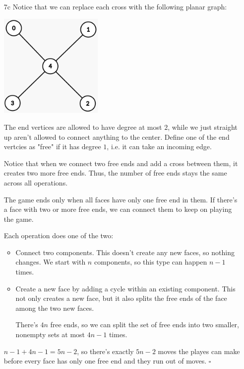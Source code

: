 \documentclass[12pt]{article}
\begin{document}
\begin{enumerate}
    \item[7c] Notice that we can replace each cross with the following planar graph:
        \begin{center}
            \includegraphics[width=5cm]{img/hw4/new_cross}
        \end{center}
        The end vertices are allowed to have degree at most $2$,
        while we just straight up aren't allowed to connect anything to the center.
        Define one of the end vertcies as "free" if it has degree $1$,
        i.e. it can take an incoming edge.

        Notice that when we connect two free ends and add
        a cross between them, it creates two more free ends.
        Thus, the number of free ends stays the same across all operations.

        The game ends only when all faces have only one free end in them.
        If there's a face with two or more free ends,
        we can connect them to keep on playing the game.

        Each operation does one of the two:
        \begin{itemize}
            \item Connect two components.
                  This doesn't create any new faces, so nothing changes.
                  We start with $n$ components, so this type can happen $n-1$ times.

            \item Create a new face by adding a cycle within an existing component.
                  This not only creates a new face, but it also splits the free
                  ends of the face among the two new faces.

                  There's $4n$ free ends, so we can split the set of free ends
                  into two smaller, nonempty sets at most $4n-1$ times.
        \end{itemize}
        $n-1+4n-1=\boxed{5n-2}$, so there's exactly $5n-2$ moves
        the playes can make before every face has only one free end
        and they run out of moves. $\square$
\end{enumerate}
\end{document}
